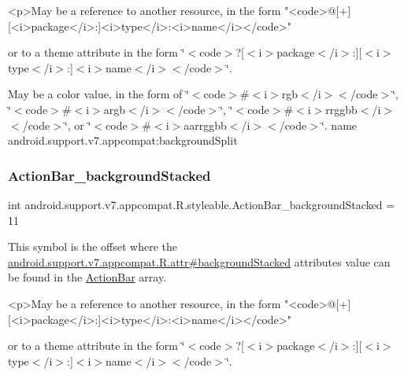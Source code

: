 \begin{DoxyVerb}      <p>May be a reference to another resource, in the form "<code>@[+][<i>package</i>:]<i>type</i>:<i>name</i></code>"
\end{DoxyVerb}
 or to a theme attribute in the form \char`\"{}$<$code$>$?\mbox{[}$<$i$>$package$<$/i$>$\+:\mbox{]}\mbox{[}$<$i$>$type$<$/i$>$\+:\mbox{]}$<$i$>$name$<$/i$>$$<$/code$>$\char`\"{}. 

May be a color value, in the form of \char`\"{}$<$code$>$\#$<$i$>$rgb$<$/i$>$$<$/code$>$\char`\"{}, \char`\"{}$<$code$>$\#$<$i$>$argb$<$/i$>$$<$/code$>$\char`\"{}, \char`\"{}$<$code$>$\#$<$i$>$rrggbb$<$/i$>$$<$/code$>$\char`\"{}, or \char`\"{}$<$code$>$\#$<$i$>$aarrggbb$<$/i$>$$<$/code$>$\char`\"{}.  name android.\+support.\+v7.\+appcompat\+:background\+Split \mbox{\label{classandroid_1_1support_1_1v7_1_1appcompat_1_1R_1_1styleable_afc6f542df304273e42d5109d94293071}} 
\subsubsection{\texorpdfstring{Action\+Bar\+\_\+background\+Stacked}{ActionBar\_backgroundStacked}}
{\footnotesize\ttfamily int android.\+support.\+v7.\+appcompat.\+R.\+styleable.\+Action\+Bar\+\_\+background\+Stacked = 11\hspace{0.3cm}{\ttfamily [static]}}

This symbol is the offset where the \hyperlink{classandroid_1_1support_1_1v7_1_1appcompat_1_1R_1_1attr_a917a60116d782ec096fb8ca79630cb1e}{android.\+support.\+v7.\+appcompat.\+R.\+attr\#background\+Stacked} attribute\textquotesingle{}s value can be found in the \hyperlink{classandroid_1_1support_1_1v7_1_1appcompat_1_1R_1_1styleable_a5941dc15714398e9ec9afaa0155cc1cf}{Action\+Bar} array.

\begin{DoxyVerb}      <p>May be a reference to another resource, in the form "<code>@[+][<i>package</i>:]<i>type</i>:<i>name</i></code>"
\end{DoxyVerb}
 or to a theme attribute in the form \char`\"{}$<$code$>$?\mbox{[}$<$i$>$package$<$/i$>$\+:\mbox{]}\mbox{[}$<$i$>$type$<$/i$>$\+:\mbox{]}$<$i$>$name$<$/i$>$$<$/code$>$\char`\"{}. 

